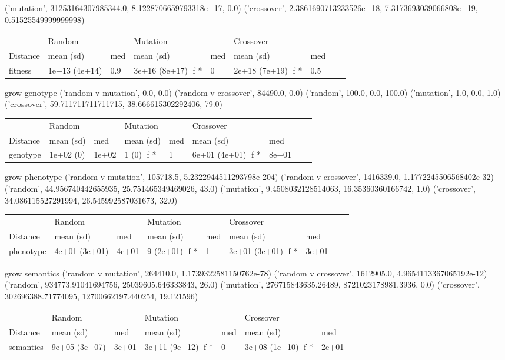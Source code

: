 ('mutation', 31253164307985344.0, 8.1228706659793318e+17, 0.0)
('crossover', 2.3861690713233526e+18, 7.3173693039066808e+19, 0.51525549999999998)
\begin{tabular}{l|ll|lll|lll}
         & Random      &      & Mutation       &       & Crossover       &       \\
Distance & mean (sd)   & med  & mean (sd)      & med   & mean (sd)       & med   \\ \hline
 fitness      & 1e+13 (4e+14) & 0.9 & 3e+16 (8e+17) {f *} & 0  & 2e+18 (7e+19) {f *}  & 0.5  \\
\end{tabular}
grow
genotype
('random v mutation', 0.0, 0.0)
('random v crossover', 84490.0, 0.0)
('random', 100.0, 0.0, 100.0)
('mutation', 1.0, 0.0, 1.0)
('crossover', 59.711711711711715, 38.666615302292406, 79.0)
\begin{tabular}{l|ll|lll|lll}
         & Random      &      & Mutation       &       & Crossover       &       \\
Distance & mean (sd)   & med  & mean (sd)      & med   & mean (sd)       & med   \\ \hline
 genotype      & 1e+02 (0) & 1e+02 & 1 (0) {f *} & 1  & 6e+01 (4e+01) {f *}  & 8e+01  \\
\end{tabular}
grow
phenotype
('random v mutation', 105718.5, 5.2322944511293798e-204)
('random v crossover', 1416339.0, 1.1772245506568402e-32)
('random', 44.956740442655935, 25.751465349469026, 43.0)
('mutation', 9.4508032128514063, 16.35360360166742, 1.0)
('crossover', 34.086115527291994, 26.545992587031673, 32.0)
\begin{tabular}{l|ll|lll|lll}
         & Random      &      & Mutation       &       & Crossover       &       \\
Distance & mean (sd)   & med  & mean (sd)      & med   & mean (sd)       & med   \\ \hline
 phenotype      & 4e+01 (3e+01) & 4e+01 & 9 (2e+01) {f *} & 1  & 3e+01 (3e+01) {f *}  & 3e+01  \\
\end{tabular}
grow
semantics
('random v mutation', 264410.0, 1.1739322581150762e-78)
('random v crossover', 1612905.0, 4.9654113367065192e-12)
('random', 934773.91041694756, 25039605.646333843, 26.0)
('mutation', 276715843635.26489, 8721023178981.3936, 0.0)
('crossover', 302696388.71774095, 12700662197.440254, 19.121596)
\begin{tabular}{l|ll|lll|lll}
         & Random      &      & Mutation       &       & Crossover       &       \\
Distance & mean (sd)   & med  & mean (sd)      & med   & mean (sd)       & med   \\ \hline
 semantics      & 9e+05 (3e+07) & 3e+01 & 3e+11 (9e+12) {f *} & 0  & 3e+08 (1e+10) {f *}  & 2e+01  \\
\end{tabular}
